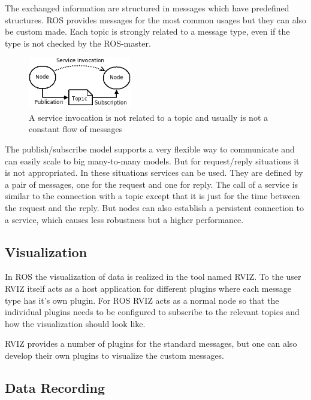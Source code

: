 The exchanged information are structured in messages which have predefined structures.
ROS provides messages for the most common usages but they can also be custom made.
Each topic is strongly related to a message type, even if the type is not checked by the ROS-master.

\begin{figure}
	\centering
	\includegraphics[width=0.4\textwidth]{img/ros_master/service.png}

	\caption{A service invocation is not related to a topic and usually is not a constant flow of messages}
    \label{fig:service_invocation}
\end{figure}

The publish/subscribe model supports a very flexible way to communicate and can easily scale to big many-to-many models.
But for request/reply situations it is not appropriated.
In these situations services can be used.
They are defined by a pair of messages, one for the request and one for reply.
The call of a service is similar to the connection with a topic except that it is just for the time between the request and the reply.
But nodes can also establish a persistent connection to a service, which causes less robustness but a higher performance.

\subsection{Visualization}\label{ssec:visualization}

In ROS the visualization of data is realized in the tool named RVIZ.
To the user RVIZ itself acts as a host application for different plugins where each message type has it's own plugin.
For ROS RVIZ acts as a normal node so that the individual plugins needs to be configured to subscribe to the relevant topics and how the visualization should look like.

RVIZ provides a number of plugins for the standard messages, but one can also develop their own plugins to visualize the custom messages.

\subsection{Data Recording}\label{ssec:dataRecording}

